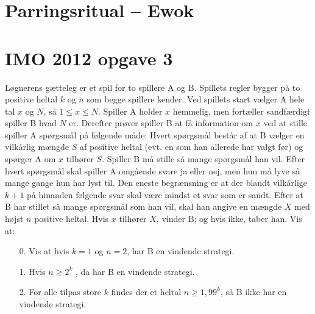 \documentclass[article,10pt,a4,oneside]{memoir}
\begin{document}
\begin{minipage}[b]{1.95\textwidth}
\begin{minipage}[t]{0.23\linewidth}
\vspace{3mm}
\section*{Parringsritual -- Ewok}

\end{minipage}
\hfill
\begin{minipage}[t]{0.73\linewidth}
\begin{minipage}[t]{0.64\linewidth}
\vspace{3mm}
\section*{IMO 2012 opgave 3}
Løgnerens gætteleg er et spil for to spillere A og B. Spillets regler bygger på to positive
heltal $k$ og $n$ som begge spillere kender. Ved spillets start vælger A hele tal $x$ og $N$, så $1 \le x \le N$. Spiller A holder $x$ hemmelig, men fortæller sandfærdigt spiller B hvad $N$ er. Derefter prøver spiller B at få information om $x$ ved at stille spiller A spørgsmål på følgende måde: Hvert spørgsmål består af at B vælger en vilkårlig mængde $S$ af positive heltal (evt. en som han allerede har valgt før) og spørger A om $x$ tilhører $S$. Spiller B må stille så mange spørgsmål han vil. Efter hvert spørgsmål skal spiller A omgående svare ja eller nej, men hun må lyve så mange gange hun har lyst til. Den eneste begrænsning er at der blandt vilkårlige $k + 1$ på hinanden følgende svar skal være mindst et svar som er sandt. Efter at B har stillet så mange spørgsmål som han vil, skal han angive en mængde $X$ med højst $n$ positive heltal. Hvis $x$ tilhører $X$, vinder B; og hvis ikke, taber han. Vis at:
\begin{enumerate}
\item[0.] Vis at hvis $k=1$ og $n=2$, har B en vindende strategi.
\item[1.] Hvis $n \ge 2^k$ , da har B en vindende strategi.
\item[2.] For alle tilpas store $k$ findes der et heltal $n \ge 1,99^k$, så B ikke har en vindende strategi.
\end{enumerate}


\end{minipage}
\end{minipage}
\end{minipage}
\end{document}
